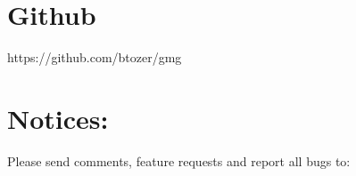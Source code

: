 \documentclass[a4paper,10pt,english]{sphinxmanual}
\begin{document}
\chapter{Github}
\label{\detokenize{gmg_documentation:github}}
%
\begin{sphinxVerbatim}[commandchars=\\\{\}]
https://github.com/btozer/gmg
\end{sphinxVerbatim}


\chapter{Notices:}
\label{\detokenize{gmg_documentation:notices}}
Please send comments, feature requests and report all bugs to: 



\renewcommand{\indexname}{Index}
\printindex
\end{document}
